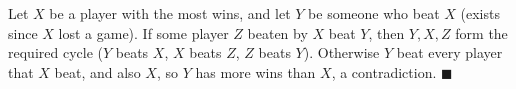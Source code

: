 Let $X$ be a player with the most wins, and let $Y$ be someone who beat $X$ (exists since $X$ lost a game). If some player $Z$ beaten by $X$ beat $Y$, then $Y,X,Z$ form the required cycle ($Y$ beats $X$, $X$ beats $Z$, $Z$ beats $Y$). Otherwise $Y$ beat every player that $X$ beat, and also $X$, so $Y$ has more wins than $X$, a contradiction. $\blacksquare$
